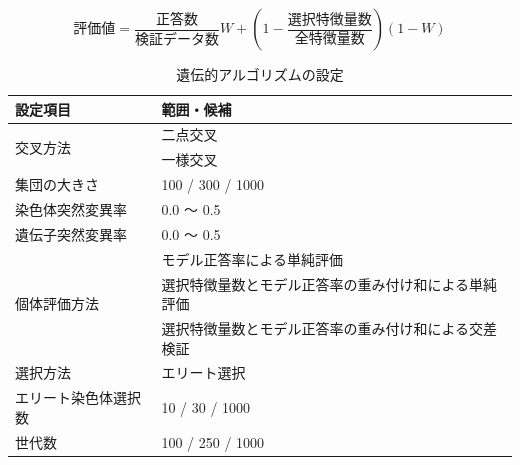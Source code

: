 \begin{equation}
    \label{form:evaluation}
    評価値 = \frac{正答数}{検証データ数} W + (1 - \frac{選択特徴量数}{全特徴量数}) (1 - W)
\end{equation}

\begin{table}[t]
    \caption{遺伝的アルゴリズムの設定}
    \centering
    \begin{tabular}{ll}
        \hline
        設定項目 & 範囲・候補 \\ \hline\hline
        \multirow{2}{*}{交叉方法} & 二点交叉 \\
        & 一様交叉 \\ \hline
        集団の大きさ & 100 / 300 / 1000 \\ \hline
        染色体突然変異率 & 0.0 〜 0.5 \\ \hline
        遺伝子突然変異率 & 0.0 〜 0.5 \\ \hline
        \multirow{3}{*}{個体評価方法} & モデル正答率による単純評価 \\
        & 選択特徴量数とモデル正答率の重み付け和による単純評価 \\
        & 選択特徴量数とモデル正答率の重み付け和による交差検証 \\ \hline
        選択方法 & エリート選択 \\ \hline
        エリート染色体選択数 & 10 / 30 / 1000 \\ \hline
        世代数 & 100 / 250 / 1000 \\ \hline
    \end{tabular}
    \label{tab:ga_setting}
\end{table}
